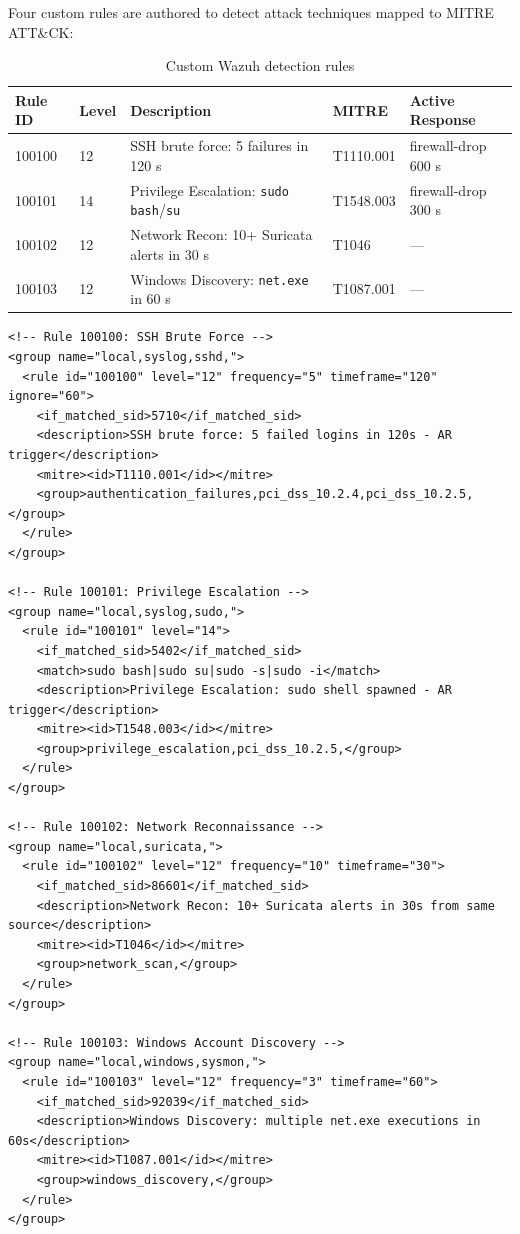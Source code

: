 \documentclass[12pt,a4paper]{report}
\begin{document}
Four custom rules are authored to detect attack techniques mapped to MITRE ATT\&CK:

\begin{table}[H]
\centering
\caption{Custom Wazuh detection rules}
\begin{tabular}{lllll}
\toprule
\textbf{Rule ID} & \textbf{Level} & \textbf{Description} & \textbf{MITRE} & \textbf{Active Response} \\
\midrule
100100 & 12 & SSH brute force: 5 failures in 120 s   & T1110.001 & firewall-drop 600 s \\
100101 & 14 & Privilege Escalation: \texttt{sudo bash}/\texttt{su} & T1548.003 & firewall-drop 300 s \\
100102 & 12 & Network Recon: 10+ Suricata alerts in 30 s & T1046 & --- \\
100103 & 12 & Windows Discovery: \texttt{net.exe} in 60 s & T1087.001 & --- \\
\bottomrule
\end{tabular}
\label{tab:rules}
\end{table}

\begin{lstlisting}[style=xmlstyle, caption=Custom detection rules XML]
<!-- Rule 100100: SSH Brute Force -->
<group name="local,syslog,sshd,">
  <rule id="100100" level="12" frequency="5" timeframe="120" ignore="60">
    <if_matched_sid>5710</if_matched_sid>
    <description>SSH brute force: 5 failed logins in 120s - AR trigger</description>
    <mitre><id>T1110.001</id></mitre>
    <group>authentication_failures,pci_dss_10.2.4,pci_dss_10.2.5,</group>
  </rule>
</group>

<!-- Rule 100101: Privilege Escalation -->
<group name="local,syslog,sudo,">
  <rule id="100101" level="14">
    <if_matched_sid>5402</if_matched_sid>
    <match>sudo bash|sudo su|sudo -s|sudo -i</match>
    <description>Privilege Escalation: sudo shell spawned - AR trigger</description>
    <mitre><id>T1548.003</id></mitre>
    <group>privilege_escalation,pci_dss_10.2.5,</group>
  </rule>
</group>

<!-- Rule 100102: Network Reconnaissance -->
<group name="local,suricata,">
  <rule id="100102" level="12" frequency="10" timeframe="30">
    <if_matched_sid>86601</if_matched_sid>
    <description>Network Recon: 10+ Suricata alerts in 30s from same source</description>
    <mitre><id>T1046</id></mitre>
    <group>network_scan,</group>
  </rule>
</group>

<!-- Rule 100103: Windows Account Discovery -->
<group name="local,windows,sysmon,">
  <rule id="100103" level="12" frequency="3" timeframe="60">
    <if_matched_sid>92039</if_matched_sid>
    <description>Windows Discovery: multiple net.exe executions in 60s</description>
    <mitre><id>T1087.001</id></mitre>
    <group>windows_discovery,</group>
  </rule>
</group>
\end{lstlisting}
\end{document}
